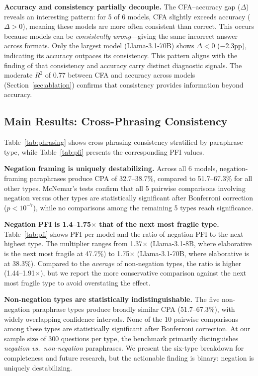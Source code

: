 \documentclass{article}
\begin{document}
\textbf{Accuracy and consistency partially decouple.} The CFA--accuracy gap ($\Delta$) reveals an interesting pattern: for 5 of 6 models, CFA slightly exceeds accuracy ($\Delta > 0$), meaning these models are more often consistent than correct. This occurs because models can be \emph{consistently wrong}---giving the same incorrect answer across formats. Only the largest model (Llama-3.1-70B) shows $\Delta < 0$ ($-$2.3pp), indicating its accuracy outpaces its consistency. This pattern aligns with the finding of \citet{rabinovich2023predicting} that consistency and accuracy carry distinct diagnostic signals. The moderate $R^2$ of 0.77 between CFA and accuracy across models (Section~\ref{sec:ablation}) confirms that consistency provides information beyond accuracy.

\subsection{Main Results: Cross-Phrasing Consistency}

Table~\ref{tab:phrasing} shows cross-phrasing consistency stratified by paraphrase type, while Table~\ref{tab:pfi} presents the corresponding PFI values.

\textbf{Negation framing is uniquely destabilizing.} Across all 6 models, negation-framing paraphrases produce CPA of 32.7--38.7\%, compared to 51.7--67.3\% for all other types. McNemar's tests confirm that all 5 pairwise comparisons involving negation versus other types are statistically significant after Bonferroni correction ($p < 10^{-7}$), while no comparisons among the remaining 5 types reach significance.

\textbf{Negation PFI is 1.4--1.75$\times$ that of the next most fragile type.} Table~\ref{tab:pfi} shows PFI per model and the ratio of negation PFI to the next-highest type. The multiplier ranges from 1.37$\times$ (Llama-3.1-8B, where elaborative is the next most fragile at 47.7\%) to 1.75$\times$ (Llama-3.1-70B, where elaborative is at 38.3\%). Compared to the \emph{average} of non-negation types, the ratio is higher (1.44--1.91$\times$), but we report the more conservative comparison against the next most fragile type to avoid overstating the effect.

\textbf{Non-negation types are statistically indistinguishable.} The five non-negation paraphrase types produce broadly similar CPA (51.7--67.3\%), with widely overlapping confidence intervals. None of the 10 pairwise comparisons among these types are statistically significant after Bonferroni correction. At our sample size of 300 questions per type, the benchmark primarily distinguishes \emph{negation vs.\ non-negation} paraphrases. We present the six-type breakdown for completeness and future research, but the actionable finding is binary: negation is uniquely destabilizing.
\end{document}
